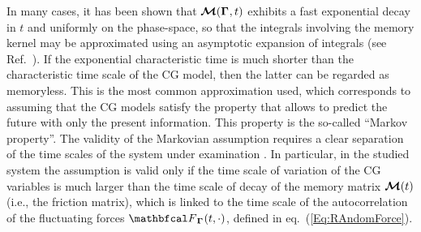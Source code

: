 \documentclass[10pt,a4paper]{book}
\theoremstyle{definition}
\begin{document}
In many cases, it has been shown that $\boldsymbol{\mathcal{M}}(\boldsymbol\Gamma_{},t)$ exhibits a fast exponential decay in $t$ and uniformly on the phase-space, so that the integrals involving the memory kernel may be approximated using an asymptotic expansion of integrals (see Ref.~\cite{bernardini1993Metodi,bleisteinAsExpInt,DiPasquale2019}). If the exponential characteristic time is much shorter than the characteristic time scale of the CG model, then the latter can be regarded as memoryless. This is the most common approximation used, which corresponds to assuming that the CG models satisfy the property that allows to predict the future with only the present information. This property is the so-called ``Markov property''.
The validity of the Markovian assumption requires a clear separation of the time scales of the system under examination \cite{DiPasquale2019,Hijon2010,Hijon2006}.
In particular, in the studied system the assumption is valid only if the time scale of variation of the CG variables is much larger than the time scale of decay of the memory matrix $\boldsymbol{\mathcal{M}}(t)$ (i.e., the friction matrix), which is linked to the time scale of the autocorrelation of the fluctuating forces $\fprojbf_{\Bphase{}}(t,\cdot)$, defined in eq.~(\ref{Eq:RAndomForce}).
\end{document}

